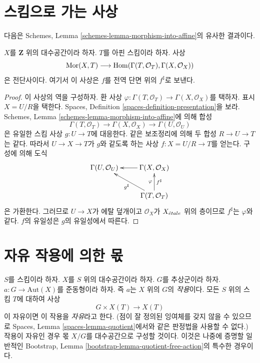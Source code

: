 \section{스킴으로 가는 사상}
\label{section-morphisms-to-schemes}

\noindent
다음은 Schemes, Lemma \ref{schemes-lemma-morphism-into-affine}의 유사한 결과이다.

\begin{lemma}
\label{lemma-morphism-to-affine-scheme}
$X$를 $\mathbf{Z}$ 위의 대수공간이라 하자.
$T$를 아핀 스킴이라 하자. 사상
$$
\mathop{\mathrm{Mor}}\nolimits(X, T)
\longrightarrow
\mathop{\mathrm{Hom}}\nolimits(\Gamma(T, \mathcal{O}_T), \Gamma(X, \mathcal{O}_X))
$$
은 전단사이다. 여기서 이 사상은 $f$를 전역 단면 위의 $f^\sharp$로 보낸다.
\end{lemma}

\begin{proof}
이 사상의 역을 구성하자. 환 사상
$\varphi : \Gamma(T, \mathcal{O}_T) \to \Gamma(X, \mathcal{O}_X)$를
택하자. 표시 $X = U/R$을 택한다. Spaces, Definition
\ref{spaces-definition-presentation}을 보라. Schemes, Lemma
\ref{schemes-lemma-morphism-into-affine}에 의해 합성
$$
\Gamma(T, \mathcal{O}_T) \to \Gamma(X, \mathcal{O}_X) \to
\Gamma(U, \mathcal{O}_U)
$$
은 유일한 스킴 사상 $g : U \to T$에 대응한다. 같은 보조정리에 의해
두 합성 $R \to U \to T$는 같다. 따라서 $U \to X \to T$가
$g$와 같도록 하는 사상 $f : X = U/R \to T$를 얻는다. 구성에 의해 도식
$$
\xymatrix{
\Gamma(U, \mathcal{O}_U) & \Gamma(X, \mathcal{O}_X) \ar[l] \\
& \Gamma(T, \mathcal{O}_T) \ar[lu]^{g^\sharp} \ar[u]^{\varphi}_{f^\sharp}
}
$$
은 가환한다. 그러므로 $U \to X$가 에탈 덮개이고 $\mathcal{O}_X$가
$X_{\acute{e}tale}$ 위의 층이므로 $f^\sharp$는 $\varphi$와 같다.
$f$의 유일성은 $g$의 유일성에서 따른다.
\end{proof}





\section{자유 작용에 의한 몫}
\label{section-quotient-by-free}

\noindent
$S$를 스킴이라 하자.
$X$를 $S$ 위의 대수공간이라 하자.
$G$를 추상군이라 하자.
$a : G \to \text{Aut}(X)$를 준동형이라 하자. 즉 $a$는 $X$ 위의
$G$의 {\it 작용}이다. 모든 $S$ 위의 스킴 $T$에 대하여 사상
$$
G \times X(T) \longrightarrow X(T)
$$
이 자유이면 이 작용을 {\it 자유}라고 한다. (점이 잘 정의된 잉여체를
갖지 않을 수 있으므로 Spaces, Lemma \ref{spaces-lemma-quotient}에서와 같은
판정법을 사용할 수 없다.) 작용이 자유인 경우 몫 $X/G$를 대수공간으로
구성할 것이다. 이것은 나중에 증명할 일반적인 Bootstrap, Lemma
\ref{bootstrap-lemma-quotient-free-action}의 특수한 경우이다.

